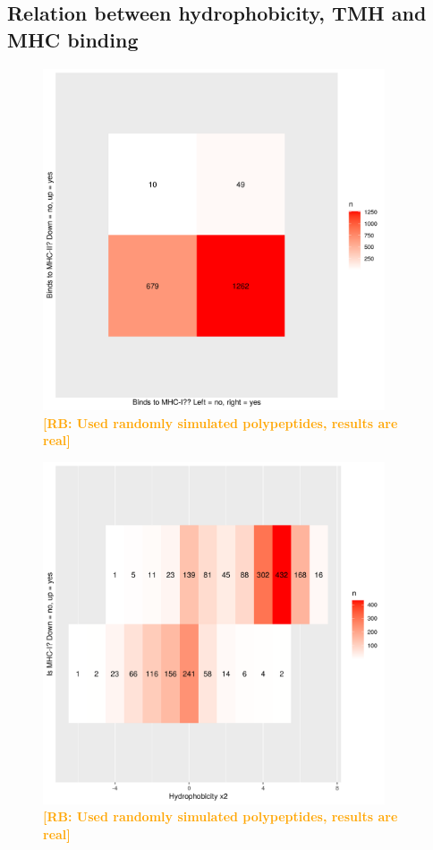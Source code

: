 \documentclass{article}
\newcommand{\richel}[1]{\textcolor{orange}{\textbf{[RB: #1]}}}
\begin{document}
\subsection{Relation between hydrophobicity, TMH and MHC binding}

\begin{figure}[!htbp]
  \includegraphics[width=0.9\textwidth]{p_bind_per_hydrophobicity/binds_mhc1_vs_binds_mhc2.png}
  \caption{
    \richel{Used randomly simulated polypeptides, results are real}
  }
  \label{fig:binds_mhc1_vs_binds_mhc2}
\end{figure}

\begin{figure}[!htbp]
  \includegraphics[width=0.9\textwidth]{p_bind_per_hydrophobicity/hydrophobicity_vs_binds_mhc1.png}
  \caption{
    \richel{Used randomly simulated polypeptides, results are real}
  }
  \label{fig:hydrophobicity_vs_binds_mhc1}
\end{figure}
\end{document}
